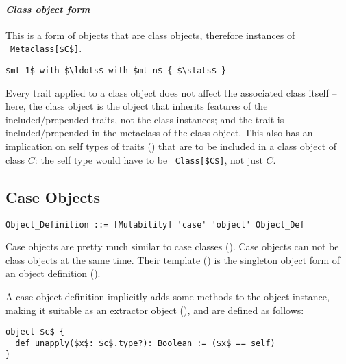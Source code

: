 \paragraph{\em Class object form}
This is a form of objects that are class objects, therefore instances of ~\lstinline!Metaclass[$C$]!. 
\begin{lstlisting}
$mt_1$ with $\ldots$ with $mt_n$ { $\stats$ }
\end{lstlisting}

Every trait applied to a class object does not affect the associated class itself -- here, the class object is the object that inherits features of the included/prepended traits, not the class instances; and the trait is included/prepended in the metaclass of the class object. This also has an implication on self types of traits () that are to be included in a class object of class $C$: the self type would have to be ~\lstinline!Class[$C$]!, not just $C$. 






\subsection{Case Objects}
\label{sec:case-objects}

\syntax\begin{lstlisting}
Object_Definition ::= [Mutability] 'case' 'object' Object_Def
\end{lstlisting}

Case objects are pretty much similar to case classes (). Case objects can not be class objects at the same time. Their template () is the singleton object form of an object definition (). 

A case object definition implicitly adds some methods to the object instance, making it suitable as an extractor object (), and are defined as follows:
\begin{lstlisting}
object $c$ {
  def unapply($x$: $c$.type?): Boolean := ($x$ == self)
}
\end{lstlisting}






